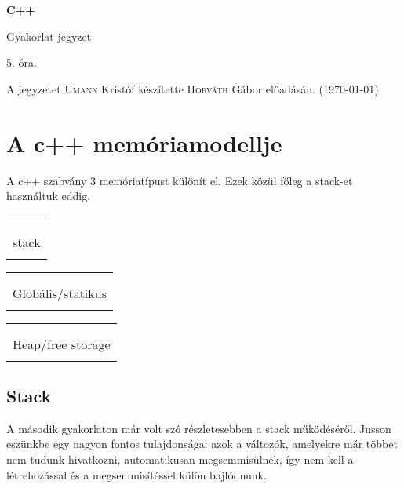 \documentclass[a4paper,11.5pt,table]{article}
\begin{document}
	\setlength\parindent{0pt}
	\def\<{<\hspace{0mm}<}
	
	\theoremstyle{definition}
	\newtheorem{note}{Megjegyzés}[subsection]
	
	\begin{center}
		{\LARGE\textbf{C++}}
		
		{\Large Gyakorlat jegyzet}
		
		5. óra.
	\end{center}
	A jegyzetet \textsc{Umann} Kristóf készítette \textsc{Horváth} Gábor  előadásán. (\today)
	\section{A c++ memóriamodellje}
	A c++ szabvány 3 memóriatípust különít el. Ezek közül főleg a stack-et használtuk eddig.
	\begin{center}
		\begin{tabular}{|c|}
			\\
			\\
			\\
			\\
			stack\\
			\\
			\hline
		\end{tabular}\quad 
		\begin{tabular}{|c|}
			\hline
			\quad \quad \\
			\\
			Globális/statikus\\
			\\
			\hline
		\end{tabular}\quad 
		\begin{tabular}{|c|}
			\hline
			\quad \quad \\
			\\
			Heap/free storage\\
			\\
			\hline
		\end{tabular}
	\end{center}
	\subsection{Stack}
	A második gyakorlaton már volt szó részletesebben a stack működéséről. Jusson eszünkbe egy nagyon fontos tulajdonsága: azok a változók, amelyekre már többet nem tudunk hivatkozni, automatikusan megsemmisülnek, így nem kell a létrehozással és a megsemmisítéssel külön bajlódnunk.
	\smallskip
	
\end{document}
